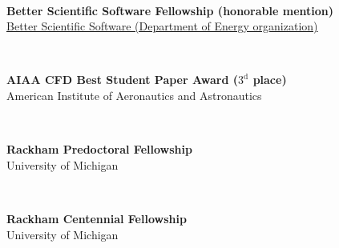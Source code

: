 \documentclass[11pt,letterpaper]{article}
\begin{document}
\begin{minipage}[t]{0.15\textwidth}%
\end{minipage}\\[2ex]%
\begin{minipage}[t]{0.82\textwidth}%
  \textbf{Better Scientific Software Fellowship (honorable mention)}\\%
  \href{https://bssw.io/blog_posts/introducing-the-2018-bssw-fellows}{Better Scientific Software (Department of Energy organization)}%
\end{minipage}\hfill%
\begin{minipage}[t]{0.15\textwidth}%
\end{minipage}\\[2ex]%
\begin{minipage}[t]{0.82\textwidth}%
  \textbf{AIAA CFD Best Student Paper Award ($3^{\text{d}}$ place)}\\%
  American Institute of Aeronautics and Astronautics%
\end{minipage}\hfill%
\begin{minipage}[t]{0.15\textwidth}%
\end{minipage}\\[2ex]%
\begin{minipage}[t]{0.82\textwidth}%
  \textbf{Rackham Predoctoral Fellowship}\\%
  University of Michigan%
\end{minipage}\hfill%
\begin{minipage}[t]{0.15\textwidth}%
\end{minipage}\\[2ex]%
\begin{minipage}[t]{0.82\textwidth}%
  \textbf{Rackham Centennial Fellowship}\\%
  University of Michigan%
\end{minipage}\hfill%
\begin{minipage}[t]{0.15\textwidth}%
\end{minipage}\\[2ex]%
\end{document}
